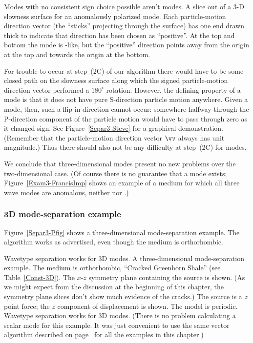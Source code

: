 {Modes with no consistent sign choice possible aren't {\qP} modes.}
{
A slice out of a 3-D slowness surface for an anomalously polarized mode.
Each particle-motion direction vector (the ``sticks''
projecting through the surface) has one end drawn thick to indicate
that direction has been chosen as ``positive''.
At the top and bottom the mode is {\qP}-like, but the ``positive''
direction points away from the origin at the top and towards the origin
at the bottom.
}

For trouble to occur at step~(2C) of our algorithm
there would have to be some closed path on the slowness surface
along which the signed particle-motion direction vector performed
a $180^\circ$ rotation.
However,
the defining property of a {\qP} mode is that
it does not have pure S-direction particle motion anywhere.
Given a {\qP} mode, then, such a flip in direction cannot occur:
somewhere halfway through the P-direction component
of the particle motion would have to pass through zero as it changed
sign. See Figure~\ref{Separ3-Steve} for a graphical demonstration.
(Remember that the particle-motion direction vector $\vv$
always has unit magnitude.)
Thus there should also not be any difficulty at step~(2C) for
{\qP} modes.

We conclude that three-dimensional {\qP} modes present
no new problems over the two-dimensional case.
(Of course there is no guarantee that a {\qP} mode exists;
Figure~\ref{Exam3-FrancisImp} shows an example of a medium for
which all three wave modes are anomalous, neither {\qP} nor {\qS}.)

\subsubsection{3D {\qP} mode-separation example}
Figure~\ref{Separ3-Pfig} shows a three-dimensional {\qP}
mode-separation example. The algorithm works as advertised,
even though the medium is orthorhombic.

{Wavetype separation works for 3D {\qP} modes.}
{A three-dimensional {\qP} mode-separation example.
The medium is orthorhombic, ``Cracked Greenhorn Shale''
(see Table~\ref{Const-3D}).
The $x$-$z$ symmetry plane containing
the source is shown. (As we might expect from the discussion at the
beginning of this chapter, the symmetry plane slices don't show much
evidence of the cracks.)
The source is a $z$ point force; the $z$
component of displacement is shown.
The model is periodic.
Wavetype separation works for 3D {\qP} modes.
(There is no problem calculating a scalar mode for this example.
It was just convenient to use the same vector algorithm described on
page~\pageref{Separ3-ModAlg} for all the examples in this chapter.)
}
